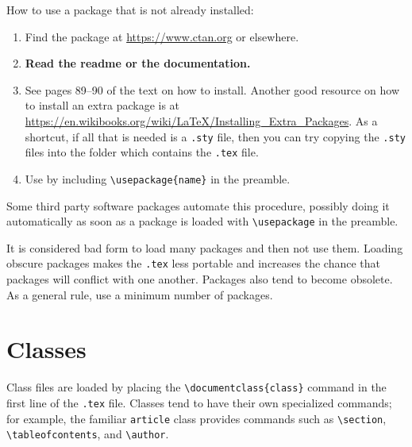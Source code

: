 \documentclass[11pt]{paper}
\begin{document}
How to use a package that is not already installed:
\begin{enumerate}[labelindent = \parindent, leftmargin = *, label={\arabic*.}]
\item Find the package at \url{https://www.ctan.org} or elsewhere.
\item \textbf{Read the readme or the documentation.}
\item See pages 89--90 of the text on how to install.  Another good
  resource on how to install an extra package is
  at
  \url{https://en.wikibooks.org/wiki/LaTeX/Installing_Extra_Packages}.
  As a shortcut, if all that is needed is a \verb~.sty~ file, then
  you can try copying the \verb~.sty~ files into the folder which
  contains the \verb~.tex~ file.
\item Use by including \verb~\usepackage{name}~ in the preamble.
\end{enumerate}
Some third party software packages automate this procedure,
possibly doing it automatically as soon as a package is loaded
with \verb~\usepackage~ in the preamble.

It is considered bad form to load many packages and then not use
them.  Loading obscure packages makes the \verb~.tex~ less
portable and increases the chance that packages will conflict with
one another.  Packages also tend to become obsolete.  As a general
rule, use a minimum number of packages.

\section{Classes}

Class files are loaded by placing the \verb~\documentclass{class}~
command in the first line of the \verb~.tex~ file.  Classes tend
to have their own specialized commands; for example, the familiar
\verb~article~ class provides commands such as \verb~\section~,
\verb~\tableofcontents~, and \verb~\author~.
\end{document}
